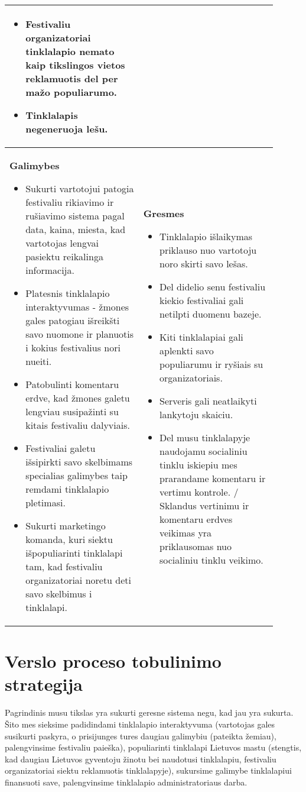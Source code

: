 ﻿\documentclass{VUMIFPSkursinis}
\begin{document}
{{\begin{longtable}{|p{0.45\linewidth}|p{0.45\linewidth}|}
\begin{itemize}
	\item Festivaliu organizatoriai tinklalapio nemato kaip tikslingos vietos reklamuotis del per mažo populiarumo.
	\item Tinklalapis negeneruoja lešu.
  \end{itemize}\\
  \hline
  \textbf{Galimybes}
  \begin{itemize}
	\item Sukurti vartotojui patogia festivaliu rikiavimo ir rušiavimo sistema pagal data, kaina, miesta, kad vartotojas lengvai pasiektu reikalinga informacija.
	\item Platesnis tinklalapio interaktyvumas - žmones gales patogiau išreikšti savo nuomone ir planuotis i kokius festivalius nori nueiti.
	\item Patobulinti komentaru erdve, kad žmones galetu lengviau susipažinti su kitais festivaliu dalyviais.
	\item Festivaliai galetu išsipirkti savo  skelbimams specialias galimybes taip remdami tinklalapio pletimasi.
	\item Sukurti marketingo komanda, kuri siektu išpopuliarinti tinklalapi tam, kad festivaliu organizatoriai noretu deti savo skelbimus i tinklalapi.
  \end{itemize}
  &
  \textbf{Gresmes}
  \begin{itemize}
	\item Tinklalapio išlaikymas priklauso nuo vartotoju noro skirti savo lešas.
	\item Del didelio senu festivaliu kiekio festivaliai gali netilpti duomenu bazeje.
	\item Kiti tinklalapiai gali aplenkti savo populiarumu ir ryšiais su organizatoriais.
	\item Serveris gali neatlaikyti lankytoju skaiciu.
	\item Del musu tinklalapyje naudojamu socialiniu tinklu iskiepiu mes prarandame komentaru ir vertimu kontrole. / Sklandus vertinimu ir komentaru erdves veikimas yra priklausomas nuo socialiniu tinklu veikimo.
  \end{itemize}\\
  \hline
\end{longtable}

\section{Verslo proceso tobulinimo strategija}
Pagrindinis musu tikslas yra sukurti geresne sistema negu, kad jau yra sukurta. Šito mes sieksime padidindami tinklalapio interaktyvuma (vartotojas gales susikurti paskyra, o prisijunges tures daugiau galimybiu (pateikta žemiau), palengvinsime festivaliu paieška), populiarinti tinklalapi Lietuvos mastu (stengtis, kad daugiau Lietuvos gyventoju žinotu bei naudotusi tinklalapiu, festivaliu organizatoriai siektu reklamuotis tinklalapyje), sukursime galimybe tinklalapiui finansuoti save, palengvinsime tinklalapio administratoriaus darba.

}}
\end{document}
